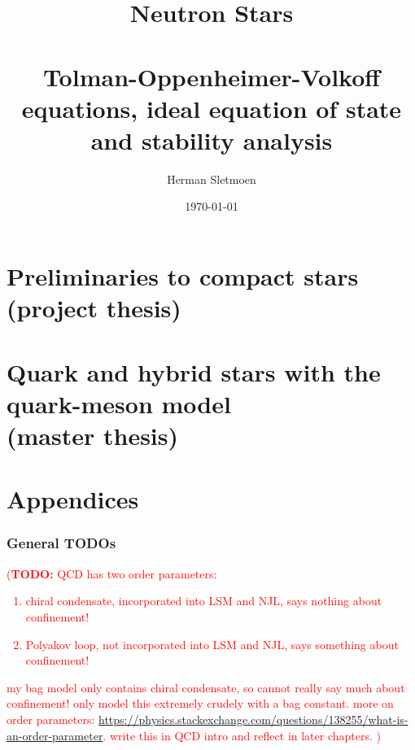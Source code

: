 \documentclass[a4paper,11pt,twoside,openany]{book}
\title{%
	Neutron Stars \\ \ \\
	\normalsize Tolman-Oppenheimer-Volkoff equations, ideal equation of state and stability analysis
}
\author{Herman Sletmoen}
\date{\today}
\newcommand\TODO[1]{\textcolor{red}{(\textbf{TODO:} #1)}}
\newcommand{\1}{\mathds{1}}
\begin{document}
\frontmatter
\begin{titlepage}
\end{titlepage}



\tableofcontents


\mainmatter
\part[Preliminaries to compact stars (project thesis)]%
{Preliminaries to compact stars \\ (project thesis)} \label{part:project}





\part[Quark and hybrid stars with the quark-meson model (master thesis)]%
{Quark and hybrid stars with the quark-meson model \\ (master thesis)} \label{part:master}






\part{Appendices} \label{part:appendices}


\backmatter
\printbibliography[heading=bibintoc, title={References}]

\pagebreak
\section*{General TODOs}
\TODO{QCD has two order parameters:
\begin{enumerate}
\item chiral condensate, incorporated into LSM and NJL, says nothing about confinement!
\item Polyakov loop, not incorporated into LSM and NJL, says something about confinement!
\end{enumerate}
my bag model only contains chiral condensate, so cannot really say much about confinement!
only model this extremely crudely with a bag constant.
more on order parameters: \url{https://physics.stackexchange.com/questions/138255/what-is-an-order-parameter}.
write this in QCD intro and reflect in later chapters.
}
\end{document}
